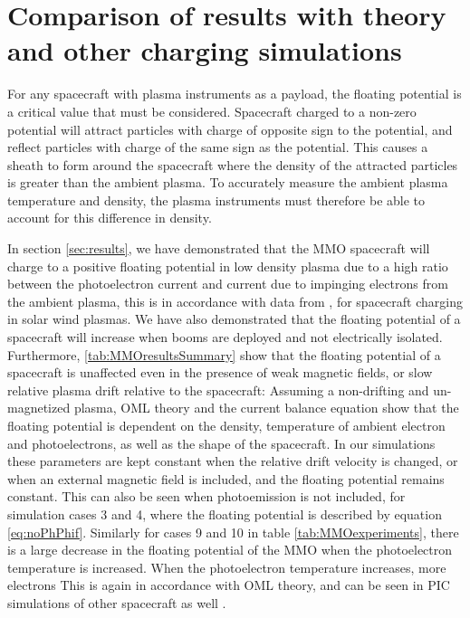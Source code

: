 \section{Comparison of results with theory and other charging simulations}

For any spacecraft with plasma instruments as a payload, the floating potential is a critical value that must be considered. Spacecraft charged to a non-zero potential will attract particles with charge of opposite sign to the potential, and reflect particles with charge of the same sign as the potential. This causes a sheath to form around the spacecraft where the density of the attracted particles is greater than the ambient plasma. To accurately measure the ambient plasma temperature and density, the plasma instruments must therefore be able to account for this difference in density.

In section \cref{sec:results}, we have demonstrated that the MMO spacecraft will charge to a positive floating potential in low density plasma due to a high ratio between the photoelectron current and current due to impinging electrons from the ambient plasma, this is in accordance with data from \parencite{Garrett1981}, for spacecraft charging in solar wind plasmas. We have also demonstrated that the floating potential of a spacecraft will increase when booms are deployed and not electrically isolated. Furthermore, \ref{tab:MMOresultsSummary} show that the floating potential of a spacecraft is unaffected even in the presence of weak magnetic fields, or slow relative plasma drift relative to the spacecraft: Assuming a non-drifting and un-magnetized plasma, OML theory and the current balance equation show that the floating potential is dependent on the density, temperature of ambient electron and photoelectrons, as well as the shape of the spacecraft. In our simulations these parameters are kept constant when the relative drift velocity is changed, or when an external magnetic field is included, and the floating potential remains constant. This can also be seen when photoemission is not included, for simulation cases 3 and 4, where the floating potential is described by equation \eqref{eq:noPhPhif}. Similarly for cases 9 and 10 in table \ref{tab:MMOexperiments}, there is a large decrease in the floating potential of the MMO when the photoelectron temperature is increased. When the photoelectron temperature increases, more electrons  This is again in accordance with OML theory, and can be seen in PIC simulations of other spacecraft as well \parencite{Sjogren2012}. 

